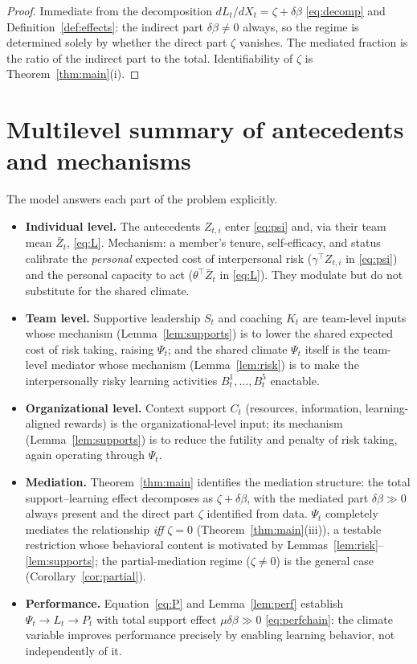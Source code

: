 \documentclass{amsart}
\theoremstyle{definition}
\theoremstyle{remark}
\begin{document}
\begin{proof}
Immediate from the decomposition $dL_t/dX_t=\zeta+\delta\beta$
\eqref{eq:decomp} and Definition~\ref{def:effects}: the indirect part
$\delta\beta\neq0$ always, so the regime is determined solely by whether
the direct part $\zeta$ vanishes. The mediated fraction is the ratio of
the indirect part to the total. Identifiability of $\zeta$ is
Theorem~\ref{thm:main}(i).
\end{proof}

\section{Multilevel summary of antecedents and mechanisms}

The model answers each part of the problem explicitly.

\begin{itemize}
\item \textbf{Individual level.} The antecedents $Z_{t,i}$ enter
\eqref{eq:psi} and, via their team mean $\bar Z_t$, \eqref{eq:L}.
Mechanism: a member's tenure, self-efficacy, and status calibrate the
\emph{personal} expected cost of interpersonal risk
($\gamma^\top Z_{t,i}$ in \eqref{eq:psi}) and the personal capacity to act
($\theta^\top\bar Z_t$ in \eqref{eq:L}). They modulate but do not
substitute for the shared climate.

\item \textbf{Team level.} Supportive leadership $S_t$ and coaching $K_t$
are team-level inputs whose mechanism (Lemma~\ref{lem:supports}) is to
lower the shared expected cost of risk taking, raising $\Psi_t$; and the
shared climate $\Psi_t$ itself is the team-level mediator whose mechanism
(Lemma~\ref{lem:risk}) is to make the interpersonally risky learning
activities $B_t^1,\dots,B_t^5$ enactable.

\item \textbf{Organizational level.} Context support $C_t$
(resources, information, learning-aligned rewards) is the
organizational-level input; its mechanism (Lemma~\ref{lem:supports}) is to
reduce the futility and penalty of risk taking, again operating through
$\Psi_t$.

\item \textbf{Mediation.} Theorem~\ref{thm:main} identifies the
mediation structure: the total support--learning effect decomposes as
$\zeta+\delta\beta$, with the mediated part $\delta\beta\gg0$ always
present and the direct part $\zeta$ identified from data. $\Psi_t$
completely mediates the relationship \emph{iff} $\zeta=0$
(Theorem~\ref{thm:main}(iii)), a testable restriction whose behavioral
content is motivated by Lemmas~\ref{lem:risk}--\ref{lem:supports}; the
partial-mediation regime ($\zeta\neq0$) is the general case
(Corollary~\ref{cor:partial}).

\item \textbf{Performance.} Equation~\eqref{eq:P} and
Lemma~\ref{lem:perf} establish $\Psi_t\to L_t\to P_t$ with total support
effect $\mu\delta\beta\gg0$ \eqref{eq:perfchain}: the climate variable
improves performance precisely by enabling learning behavior, not
independently of it.
\end{itemize}
\end{document}
